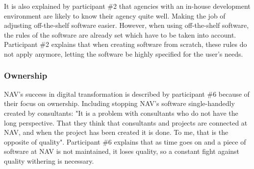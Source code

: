 
It is also explained by participant \#2 that agencies with an in-house development environment are likely to know their agency quite well. Making the job of adjusting off-the-shelf software easier. However, when using off-the-shelf software, the rules of the software are already set which have to be taken into account. Participant \#2 explains that when creating software from scratch, these rules do not apply anymore, letting the software be highly specified for the user's needs.


\subsubsection{Ownership} \label{sec:ownership}
NAV's success in digital transformation is described by participant \#6 because of their focus on ownership. Including stopping NAV's software single-handedly created by consultants: "It is a problem with consultants who do not have the long perspective. That they think that consultants and projects are connected at NAV, and when the project has been created it is done. To me, that is the opposite of quality". Participant \#6 explains that as time goes on and a piece of software at NAV is not maintained, it loses quality, so a constant fight against quality withering is necessary.


